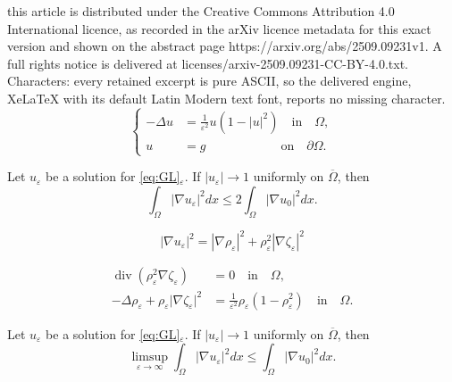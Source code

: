 \documentclass[10pt,a4paper]{amsart}
\newcommand{\Om}{{\Omega}}
\newcommand{\pa}{\partial}
\newcommand{\qin}{{\quad \mbox{in} \quad}}
\newcommand{\qon}{{\quad \mbox{on} \quad}}
\newcommand{\ve}{{\varepsilon}}
\begin{document}
this article is distributed under the Creative Commons Attribution 4.0 International licence, as recorded in the arXiv licence metadata for this exact version and shown on the abstract page https://arxiv.org/abs/2509.09231v1. A full rights notice is delivered at licenses/arxiv-2509.09231-CC-BY-4.0.txt. Characters: every retained excerpt is pure ASCII, so the delivered engine, XeLaTeX with its default Latin Modern text font, reports no missing character.
\begin{equation}
\label{eq:GL}
\left\{
\begin{aligned}
-\Delta u& = \frac{1}{\ve^2} u (1-|u|^2 ) \qin \Omega, \\
u&=g \qquad  \qquad \quad \qon \pa\Omega.
\end{aligned}
\right.
\end{equation}

\begin{lemma}\label{lem:unif conv}
Let  $u_\ve$ be a solution for  \eqref{eq:GL}$_\ve$.
If $|u_\ve| \to 1 $ uniformly on $ \overline\Om $, then
\begin{equation}\label{eq:nabla u L2}
 \int_\Om  |\nabla u_\ve|^2  dx \le 2  \int_\Om  |\nabla u_0|^2  dx .
  \end{equation}
\end{lemma}

\begin{equation}\label{eq:nabla form}
 |\nabla u_\varepsilon|^2 =    |\nabla \rho_\varepsilon|^2 +  \rho_\varepsilon^2 |\nabla \zeta_\varepsilon|^2
\end{equation}

\begin{align}\label{eq-rho-zeta-1}
\operatorname{div}\left( \rho_\varepsilon^2 \nabla \zeta_\varepsilon \right) &= 0 \qin \Omega, \\
\label{eq-rho-zeta-2}
-\Delta \rho_\ve + \rho_\ve\big| \nabla  \zeta_\varepsilon  \big|^2 & = \frac{1}{\ve^2}\rho_\ve(1- \rho_\ve^2) \qin \Om.
\end{align}

\begin{lemma}\label{lem:limsup}
Let  $u_\ve$ be a solution for  \eqref{eq:GL}$_\ve$.
If $|u_\ve| \to 1 $ uniformly on $\overline\Om $, then
\begin{equation}\label{eq:limsup}
 \limsup_{\ve \to \infty} \int_\Om |\nabla u_\ve|^2  dx \le  \int_\Om |\nabla u_0|^2  dx.
\end{equation}
\end{lemma}
\end{document}
